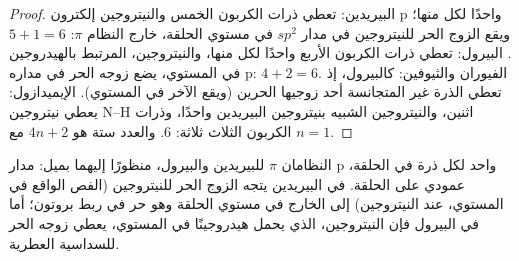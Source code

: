 \begin{proof}
البيريدين: تعطي ذرات الكربون الخمس والنيتروجين إلكترون p واحدًا لكل منها؛ ويقع الزوج
الحر للنيتروجين في مدار $sp^2$ في مستوي الحلقة، خارج النظام $\pi$: $5 + 1 = 6$.
البيرول: تعطي ذرات الكربون الأربع واحدًا لكل منها، والنيتروجين، المرتبط بالهيدروجين في المستوي،
يضع زوجه الحر في مداره p: $4 + 2 = 6$. الفيوران والثيوفين: كالبيرول، إذ
تعطي الذرة غير المتجانسة أحد زوجيها الحرين (ويقع الآخر في المستوي). الإيميدازول:
يعطي نيتروجين N--H اثنين، والنيتروجين الشبيه بنيتروجين البيريدين واحدًا، وذرات الكربون الثلاث
ثلاثة: 6. والعدد ستة هو $4n + 2$ مع $n = 1$.
\end{proof}

\begin{omfigure}

{\small النظامان $\pi$ للبيريدين والبيرول، منظورًا إليهما بميل: مدار p واحد لكل
ذرة في الحلقة، عمودي على الحلقة. في البيريدين يتجه الزوج الحر للنيتروجين (الفص الواقع في المستوي، عند
النيتروجين) إلى الخارج في مستوي الحلقة وهو حر في ربط بروتون؛ أما في البيرول فإن
النيتروجين، الذي يحمل هيدروجينًا في المستوي، يعطي زوجه الحر للسداسية
العطرية.}
\end{omfigure}

